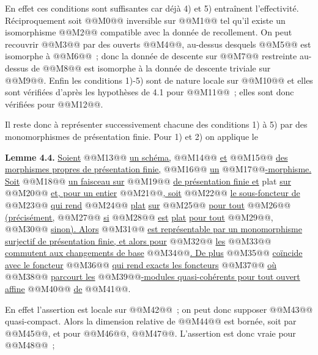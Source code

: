 
En
effet ces conditions sont suffisantes car déjà 4) et 5) entraînent l'effectivité. Réciproquement soit @@M0@@ inversible sur @@M1@@ tel qu'il existe un isomorphisme @@M2@@ compatible avec la donnée de recollement. On peut recouvrir @@M3@@ par des ouverts @@M4@@, au-dessus desquels @@M5@@ est isomorphe à @@M6@@~; donc la donnée de descente sur @@M7@@ restreinte au-dessus de @@M8@@ est isomorphe à la donnée de descente triviale sur @@M9@@. Enfin les conditions 1)-5) sont de nature locale sur @@M10@@ et elles sont vérifiées d'après les hypothèses de 4.1 pour @@M11@@~; elles sont donc vérifiées pour @@M12@@.

Il reste donc à représenter successivement chacune des conditions 1) à 5) par des monomorphismes de présentation finie. Pour 1) et 2) on applique le

\textbf{Lemme 4.4.} \uline{Soient} @@M13@@ \uline{un schéma,} @@M14@@ \uline{et} @@M15@@ \uline{des morphismes propres de présentation finie,} @@M16@@ \uline{un} @@M17@@\uline{-morphisme. Soit} @@M18@@ \uline{un faisceau sur} @@M19@@ \uline{de présentation finie et} plat \uline{sur} @@M20@@ \uline{et, pour un entier} @@M21@@\uline{, soit} @@M22@@ \uline{le sous-foncteur de} @@M23@@ \uline{qui rend} @@M24@@ \uline{plat} \uline{sur} @@M25@@ \uline{pour tout} @@M26@@ \uline{(précisément,} @@M27@@ \uline{si} @@M28@@ \uline{est} \uline{plat} \uline{pour tout} @@M29@@, @@M30@@ \uline{sinon). Alors} @@M31@@ \uline{est représentable par un monomorphisme surjectif de présentation finie, et alors pour} @@M32@@ \uline{les} @@M33@@ \uline{commutent aux changements de base} @@M34@@\uline{. De plus} @@M35@@ \uline{coïncide avec le foncteur} @@M36@@ \uline{qui rend exacts les foncteurs}
@@M37@@
\uline{où} @@M38@@ \uline{parcourt les} @@M39@@\uline{-modules quasi-cohérents pour tout ouvert affine} @@M40@@ \uline{de} @@M41@@.

En effet l'assertion est locale sur @@M42@@~; on peut donc supposer @@M43@@ quasi-compact. Alors la dimension relative de @@M44@@ est bornée, soit par @@M45@@, et pour @@M46@@, @@M47@@. L'assertion est donc vraie pour @@M48@@~;
